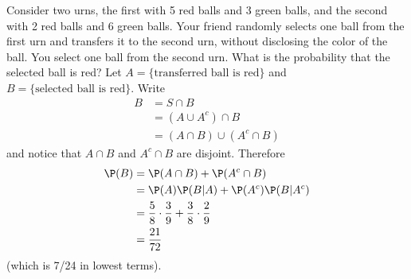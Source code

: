 \documentclass[captions=tableheading]{scrbook}
\begin{document}
\begin{example}
Consider two urns, the first with 5 red balls and 3 green balls, and the second with 2 red balls and 6 green balls. Your friend randomly selects one ball from the first urn and transfers it to the second urn, without disclosing the color of the ball. You select one ball from the second urn. What is the probability that the selected ball is red? Let \( A = \{ \mbox{transferred ball is red} \} \) and \( B = \{ \mbox{selected ball is red} \} \). Write
\begin{align*}
B & =S\cap B\\
 & =(A\cup A^{c})\cap B\\
 & =(A\cap B)\cup(A^{c}\cap B)
\end{align*}
and notice that \(A\cap B\) and \(A^{c}\cap B\) are disjoint. Therefore
\begin{align*}
\P(B) & =\P(A\cap B)+\P(A^{c}\cap B)\\
 & =\P(A)\P(B|A)+\P(A^{c})\P(B|A^{c})\\
 & =\frac{5}{8}\cdot\frac{3}{9}+\frac{3}{8}\cdot\frac{2}{9}\\
 & =\frac{21}{72}\ 
\end{align*}
(which is 7/24 in lowest terms).

\end{example}
\end{document}
